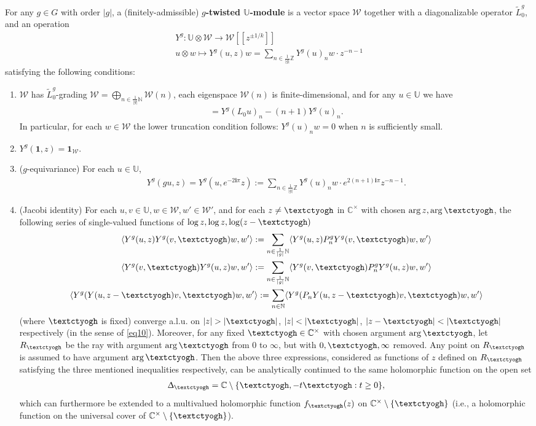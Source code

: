 \documentclass[12pt,a4paper,notitlepage]{article}
\theoremstyle{definition}
\theoremstyle{plain}
\newcommand{\mc}{\mathcal}
\newcommand{\wtd}{\widetilde}
\newcommand{\id}{\mathbf{1}}
\newcommand{\bk}[1]{\langle {#1}\rangle}
\newcommand{\im}{\mathbf{i}}
\newcommand{\Ubb}{\mathbb U}
\newcommand{\Cbb}{\mathbb C}
\newcommand{\Nbb}{\mathbb N}
\newcommand{\Zbb}{\mathbb Z}
\newcommand{\tipaz}{\text{\textctyogh}}
\numberwithin{equation}{subsection}
\begin{document}
For any $g\in G$ with order $|g|$, a (finitely-admissible)  \textbf{$g$-twisted $\Ubb$-module} is a vector space $\mc W$ together with a diagonalizable operator $\wtd L_0^g$, and an operation
\begin{gather*}
Y^g:\Ubb\otimes\mc W\rightarrow	\mc W[[z^{\pm 1/k}]]\\
u\otimes w\mapsto Y^g(u,z)w=\sum_{n\in \frac 1{|g|} \Zbb}Y^g(u)_nw\cdot z^{-n-1}
\end{gather*}
satisfying the following conditions:
\begin{enumerate}
\item $\mc W$ has $\wtd L_0^g$-grading \index{L0g@$\wtd L_0^g$} $\mc W=\bigoplus_{n\in\frac 1{|g|}\Nbb}\mc W(n)$, each eigenspace $\mc W(n)$ is finite-dimensional, and for any $u\in\Ubb$ we have
\begin{align}
[\wtd L_0^g,Y^g(u)_n]=Y^g(L_0u)_n-(n+1)Y^g(u)_n.\label{eq12}	
\end{align}
In particular, for each $w\in\mc W$ the lower truncation condition follows: $Y^g(u)_nw=0$ when $n$ is sufficiently small.
\item $Y^g(\id,z)=\id_{\mc W}$.
\item ($g$-equivariance) For each $u\in\Ubb$,
\begin{align}
Y^g(gu,z)=Y^g(u,e^{-2\im\pi}z):=\sum_{n\in \frac 1{|g|} \Zbb}Y^g(u)_nw\cdot e^{2(n+1)\im\pi}z^{-n-1}.\label{eq21}
\end{align}
\item (Jacobi identity)  For each $u,v\in\Ubb,w\in\mc W,w'\in\mc W'$, and for each $z\neq \tipaz$ in $\Cbb^\times$ with chosen $\arg z,\arg \tipaz$, the following series of single-valued functions of $\log z,\log z,\log(z-\tipaz)$
\begin{gather}
\bk{Y^g(u,z)Y^g(v,\tipaz)w,w'}:=\sum_{n\in\frac 1{|g|}\Nbb}	\bk{Y^g(u,z)P_n^gY^g(v,\tipaz)w,w'}\label{eq13}\\
\bk{Y^g(v,\tipaz)Y^g(u,z)w,w'}:=\sum_{n\in\frac 1{|g|}\Nbb}	\bk{Y^g(v,\tipaz)P_n^gY^g(u,z)w,w'}\label{eq14}\\
\bk{Y^g(Y(u,z-\tipaz)v,\tipaz)w,w'}:=\sum_{n\in\Nbb}	\bk{Y^g(P_nY(u,z-\tipaz)v,\tipaz)w,w'}\label{eq15}
\end{gather}
(where $\tipaz$ is fixed) converge a.l.u.  on $|z|>|\tipaz|$, $|z|<|\tipaz|$, $|z-\tipaz|<|\tipaz|$ respectively (in the sense of \eqref{eq10}). Moreover, for any fixed $\tipaz\in\Cbb^\times$ with chosen argument $\arg \tipaz$, let $R_{\tipaz}$ be the ray with argument $\arg \tipaz$ from $0$ to $\infty$, but with $0,\tipaz,\infty$ removed. Any point on $R_{\tipaz}$ is assumed to have argument $\arg \tipaz$. Then the above three expressions, considered as functions of $z$ defined on $R_{\tipaz}$ satisfying the three mentioned inequalities respectively, can be analytically continued to the same holomorphic function on the open set
\begin{align*}
\Updelta_\tipaz=\Cbb\setminus\{\tipaz,-t\tipaz:t\geq 0\},
\end{align*}
which can furthermore be extended to a multivalued holomorphic function $f_{\tipaz}(z)$ on $\Cbb^\times\setminus\{\tipaz\}$ (i.e., a holomorphic function on the universal cover of $\Cbb^\times\setminus\{\tipaz\}$).
\end{enumerate}
\end{document}
